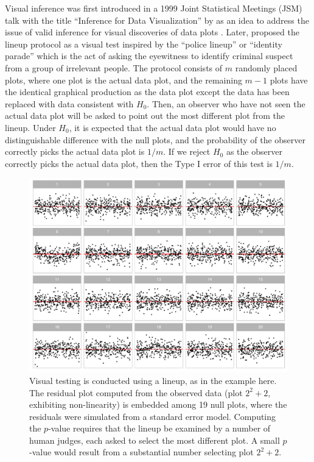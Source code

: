 \documentclass[]{interact}
\theoremstyle{plain}%
\theoremstyle{definition}
\theoremstyle{remark}
\begin{document}
Visual inference was first introduced in a 1999 Joint Statistical
Meetings (JSM) talk with the title ``Inference for Data Visualization''
by \citet{buja_inference_1999} as an idea to address the issue of valid
inference for visual discoveries of data plots
\citep{gelman_exploratory_2004}. Later, \citet{buja_statistical_2009}
proposed the lineup protocol as a visual test inspired by the ``police
lineup'' or ``identity parade'' which is the act of asking the
eyewitness to identify criminal suspect from a group of irrelevant
people. The protocol consists of \(m\) randomly placed plots, where one
plot is the actual data plot, and the remaining \(m - 1\) plots have the
identical graphical production as the data plot except the data has been
replaced with data consistent with \(H_0\). Then, an observer who have
not seen the actual data plot will be asked to point out the most
different plot from the lineup. Under \(H_0\), it is expected that the
actual data plot would have no distinguishable difference with the null
plots, and the probability of the observer correctly picks the actual
data plot is \(1/m\). If we reject \(H_0\) as the observer correctly
picks the actual data plot, then the Type I error of this test is
\(1/m\).

\begin{figure}

{\centering \includegraphics[width=1\linewidth]{paper_comparison_files/figure-latex/first-example-lineup-1} 

}

\caption{Visual testing is conducted using a lineup, as in the example here. The residual plot computed from the observed data (plot $2^2 + 2$, exhibiting non-linearity) is embedded among 19 null plots, where the residuals were simulated from a standard error model. Computing the $p$-value requires that the lineup be examined by a number of human judges, each asked to select the most different plot. A small $p$-value would result from a substantial number selecting plot $2^2 + 2$.}\label{fig:first-example-lineup}
\end{figure}
\end{document}

